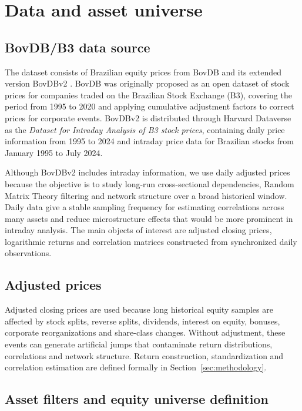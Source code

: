 \section{Data and asset universe}
\label{sec:data}

\subsection{BovDB/B3 data source}

The dataset consists of Brazilian equity prices from BovDB and its extended version BovDBv2 \cite{cardoso_2022_bovdb,souza_2024_bovdbv2}. BovDB was originally proposed as an open dataset of stock prices for companies traded on the Brazilian Stock Exchange (B3), covering the period from 1995 to 2020 and applying cumulative adjustment factors to correct prices for corporate events. BovDBv2 is distributed through Harvard Dataverse as the \emph{Dataset for Intraday Analysis of B3 stock prices}, containing daily price information from 1995 to 2024 and intraday price data for Brazilian stocks from January 1995 to July 2024.

Although BovDBv2 includes intraday information, we use daily adjusted prices because the objective is to study long-run cross-sectional dependencies, Random Matrix Theory filtering and network structure over a broad historical window. Daily data give a stable sampling frequency for estimating correlations across many assets and reduce microstructure effects that would be more prominent in intraday analysis. The main objects of interest are adjusted closing prices, logarithmic returns and correlation matrices constructed from synchronized daily observations.

\subsection{Adjusted prices}

Adjusted closing prices are used because long historical equity samples are affected by stock splits, reverse splits, dividends, interest on equity, bonuses, corporate reorganizations and share-class changes. Without adjustment, these events can generate artificial jumps that contaminate return distributions, correlations and network structure. Return construction, standardization and correlation estimation are defined formally in Section~\ref{sec:methodology}.

\subsection{Asset filters and equity universe definition}

